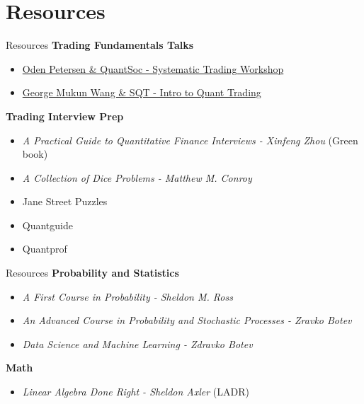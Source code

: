 \section{Resources}

\begin{frame}{Resources}
  \textbf{Trading Fundamentals Talks}
  \begin{itemize}
    \item \href{https://www.youtube.com/watch?v=hYmR5qk4z8w}{Oden Petersen \& QuantSoc - Systematic Trading Workshop}
    \item \href{https://www.youtube.com/watch?v=2YkK4DnEBRE}{George Mukun Wang \& SQT - Intro to Quant Trading}
  \end{itemize}

  \textbf{Trading Interview Prep}
  \begin{itemize}
    \item \textit{A Practical Guide to Quantitative Finance Interviews - Xinfeng Zhou} (Green book)
    \item \textit{A Collection of Dice Problems - Matthew M. Conroy}
    \item Jane Street Puzzles
    \item Quantguide
    \item Quantprof
  \end{itemize}
\end{frame}

\begin{frame}{Resources}
  \textbf{Probability and Statistics}
  \begin{itemize}
    \item \textit{A First Course in Probability - Sheldon M. Ross}
    \item \textit{An Advanced Course in Probability and Stochastic Processes - Zravko Botev}
    \item \textit{Data Science and Machine Learning - Zdravko Botev}
  \end{itemize}

  \textbf{Math}
  \begin{itemize}
    \item \textit{Linear Algebra Done Right - Sheldon Axler} (LADR)
  \end{itemize}
\end{frame}

